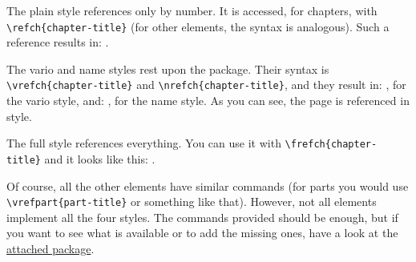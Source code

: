 The plain style references only by number. It is accessed, for chapters, 
with \lstinline|\refch{chapter-title}| (for other elements, the syntax 
is analogous). Such a reference results in: .

The vario and name styles rest upon the  package. 
Their syntax is \lstinline|\vrefch{chapter-title}| and 
\lstinline|\nrefch{chapter-title}|, and they result in: 
, for the vario style, and: , for 
the name style. As you can see, the page is referenced in 
 style.

The full style references everything. You can use it with 
\lstinline|\frefch{chapter-title}| and it looks like this: 
.

Of course, all the other elements have similar commands (\eg for parts 
you would use \lstinline|\vrefpart{part-title}| or something like that). 
However, not all elements implement all the four styles. The commands 
provided should be enough, but if you want to see what is available or 
to add the missing ones, have a look at the 
\href{styles/references.sty}{attached package}.
